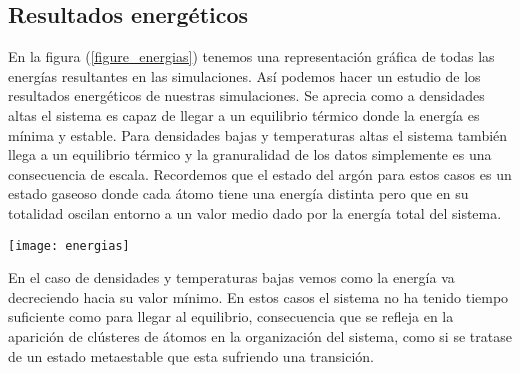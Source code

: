 \subsection{Resultados energéticos}

En la figura (\ref{figure_energias}) tenemos una representación gráfica de todas las energías resultantes en las simulaciones. Así podemos hacer un estudio de los resultados energéticos de nuestras simulaciones. Se aprecia como a densidades altas el sistema es capaz de llegar a un equilibrio térmico donde la energía es mínima y estable. Para densidades bajas y temperaturas altas el sistema también llega a un equilibrio térmico y la granuralidad de los datos simplemente es una consecuencia de escala. Recordemos que el estado del argón para estos casos es un estado gaseoso donde cada átomo tiene una energía distinta pero que en su totalidad oscilan entorno a un valor medio dado por la energía total del sistema.

\begin{figure*}[t]
	\texttt{[image: energias]}
	\caption{Energías promedio para los distintos valores de $\Sigma$ y $T$}
	\label{figure_energias}
\end{figure*}

En el caso de densidades y temperaturas bajas vemos como la energía va decreciendo hacia su valor mínimo. En estos casos el sistema no ha tenido tiempo suficiente como para llegar al equilibrio, consecuencia que se refleja en la aparición de clústeres de átomos en la organización del sistema, como si se tratase de un estado metaestable que esta sufriendo una transición.